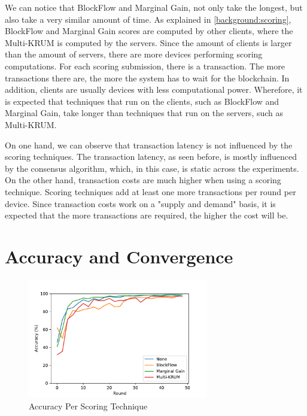 We can notice that BlockFlow and Marginal Gain, not only take the longest, but also take a very similar amount of time. As explained in \autoref{background:scoring}, BlockFlow and Marginal Gain scores are computed by other clients, where the Multi-KRUM is computed by the servers. Since the amount of clients is larger than the amount of servers, there are more devices performing scoring computations. For each scoring submission, there is a transaction. The more transactions there are, the more the system has to wait for the blockchain. In addition, clients are usually devices with less computational power. Wherefore, it is expected that techniques that run on the clients, such as BlockFlow and Marginal Gain, take longer than techniques that run on the servers, such as Multi-KRUM.

On one hand, we can observe that transaction latency is not influenced by the scoring techniques. The transaction latency, as seen before, is mostly influenced by the consensus algorithm, which, in this case, is static across the experiments. On the other hand, transaction costs are much higher when using a scoring technique. Scoring techniques add at least one more transactions per round per device. Since transaction costs work on a "supply and demand" basis, it is expected that the more transactions are required, the higher the cost will be.

\section{Accuracy and Convergence}

\begin{figure}[!ht]
    \centering
    \centering
    \includegraphics[width=0.7\textwidth]{graphics/04_scoring_accuracy.pdf}
    \caption{Accuracy Per Scoring Technique}
    \label{fig:accuracy_scoring}
\end{figure}

